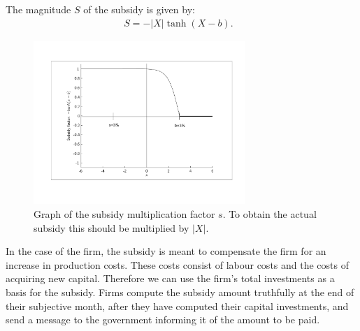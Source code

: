\bigskip The magnitude $S$ of the subsidy is given by:
\begin{equation}
\begin{array}{l}
S=-|X|\tanh (X-b).\text{ }%
\end{array}%
\end{equation}

\begin{figure}[ht!]
\centering\leavevmode
\begin{boxedminipage}{14cm}
\centering\leavevmode
\includegraphics[width=8cm]{./stabilization/png/subsidy.png}
\end{boxedminipage}
\caption{Graph of the subsidy multiplication factor $s$. To obtain the
actual subsidy this should be multiplied by $|X|$.}
\label{Figure: subsidy multiplication factor}
\end{figure}

In the case of the firm, the subsidy is meant to compensate the firm for an
increase in production costs. These costs consist of labour costs and the
costs of acquiring new capital. Therefore we can use the firm's total
investments as a basis for the subsidy. Firms compute the subsidy amount
truthfully at the end of their subjective month, after they have computed
their capital investments, and send a message to the government informing it
of the amount to be paid.
